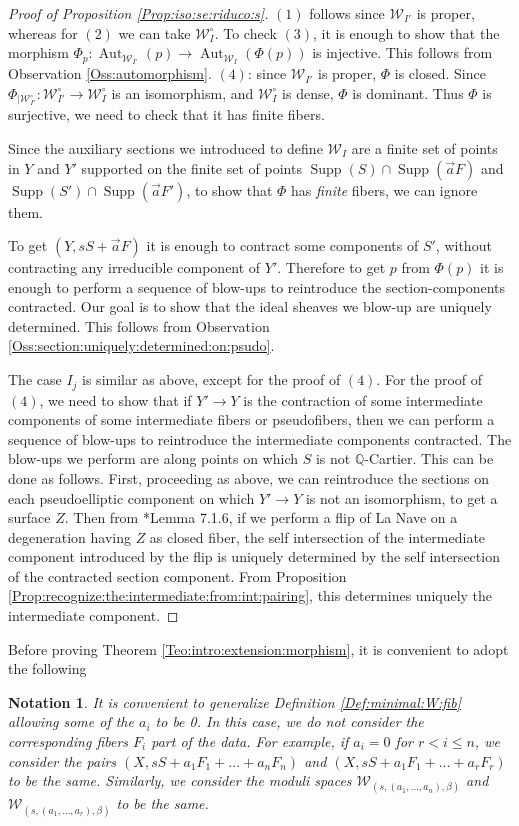 \documentclass[11pt]{amsart}
\newcommand{\cE}{\mathcal{W}}
\newcommand{\supp}{\operatorname{Supp}}
\newcommand{\Aut}{\operatorname{Aut}}
\newtheorem{Notation}[theorem]{Notation}
\theoremstyle{definition}
\begin{document}
\begin{proof}[Proof of Proposition \ref{Prop:iso:se:riduco:s}]
 $(1)$ follows since $\cE_{I'}$ is proper, whereas for $(2)$ we can take $\cE_{I}^\circ$.
To check $(3)$, it is enough to show that
the morphism $\Phi_p:\Aut_{\cE_{I'}}(p) \xrightarrow{ }
\Aut_{\cE_{I}}(\Phi(p))$ is injective. This follows from Observation \ref{Oss:automorphism}.
$(4)$: since $\cE_{I'}$ is proper, $\Phi$ is closed. Since $\Phi_{|\cE_{I'}^\circ}:\cE_{I'}^\circ \to \cE_{I}^\circ$
is an isomorphism, and $\cE^\circ_{I}$ is dense,
$\Phi$ is dominant. Thus
$\Phi$ is surjective, we need to check that it has finite fibers.

Since the auxiliary sections we introduced to define $\cE_I$ are a finite set of points in $Y$ and $Y'$ supported on the finite set of points $\supp(S) \cap \supp(\vec{a}F)$ and
$\supp(S') \cap \supp(\vec{a}F')$, to show that $\Phi$ has \emph{finite} fibers, we can ignore them.

To get $(Y,sS+\vec{a}F)$
it is enough to contract some components of $S'$,
without contracting any irreducible component of $Y'$. Therefore to get $p$ from $\Phi(p)$ it is enough
to perform a sequence of blow-ups to reintroduce the section-components contracted. Our goal is to show that the ideal sheaves we blow-up are uniquely
determined. This follows from Observation \ref{Oss:section:uniquely:determined:on:psudo}. 

The case $I_j$ is similar as above, except for the proof of $(4)$. For the proof of $(4)$, we need to show that
if $Y' \to Y$ is the contraction of some intermediate components of some intermediate fibers or pseudofibers, then we can
perform a sequence of blow-ups to reintroduce the intermediate components contracted.
The blow-ups we perform are along points on which $S$ is not $\mathbb{Q}$-Cartier.  This can be done as follows. First, proceeding as above, we can reintroduce the sections on each pseudoelliptic component on which $Y' \to Y$ is
not an isomorphism, to get a surface $Z$. Then from \cite{LaNave}*{Lemma 7.1.6}, if we perform a flip of La Nave on a degeneration having $Z$ as closed fiber, the self intersection of the intermediate component introduced by the flip is uniquely determined by the self intersection of the contracted section component. From Proposition \ref{Prop:recognize:the:intermediate:from:int:pairing}, this determines uniquely the intermediate component.\end{proof}

Before proving Theorem \ref{Teo:intro:extension:morphism}, it is convenient to adopt the following \begin{Notation}\label{Notation:ai:zero}It is convenient to generalize Definition \ref{Def:minimal:W:fib} allowing some of the $a_i$ to be 0. In this case, we do \emph{not} consider the corresponding fibers $F_{i}$ part of the data. For example, if $a_{i}=0$ for $r<i\le n$, we consider the pairs
$(X,sS+a_1F_1+...+a_nF_n)$ and $(X,sS+a_1F_1+...+a_rF_r)$ to be the same. Similarly, we consider the moduli spaces $\cE_{(s,(a_{1},...,a_n),\beta)}$ and $\cE_{(s,(a_1,...,a_r),\beta)}$ to be the same.
\end{Notation}
\end{document}

